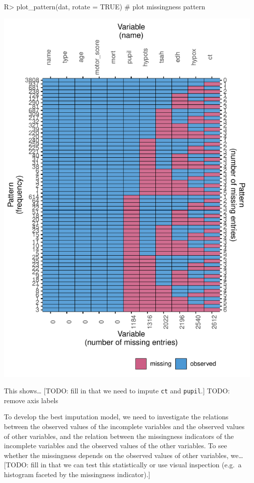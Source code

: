 \documentclass[
]{jss}
\begin{document}
\begin{CodeChunk}
\begin{CodeInput}
R> plot_pattern(dat, rotate = TRUE)  # plot missingness pattern
\end{CodeInput}


\begin{center}\includegraphics{Imputation_of_Incomplete_Multilevel_Data_files/figure-latex/pattern-1} \end{center}

\end{CodeChunk}

This shows\ldots{} {[}TODO: fill in that we need to impute \texttt{ct}
and \texttt{pupil}.{]} TODO: remove axis labels

To develop the best imputation model, we need to investigate the
relations between the observed values of the incomplete variables and
the observed values of other variables, and the relation between the
missingness indicators of the incomplete variables and the observed
values of the other variables. To see whether the missingness depends on
the observed values of other variables, we\ldots{} {[}TODO: fill in that
we can test this statistically or use visual inspection (e.g.~a
histogram faceted by the missingness indicator).{]}
\end{document}

